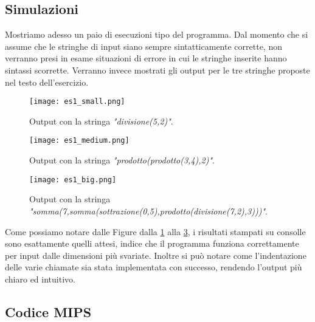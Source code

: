 	\subsection*{Simulazioni}
		Mostriamo adesso un paio di esecuzioni tipo del programma. Dal momento che si assume che le stringhe di input siano sempre sintatticamente corrette, non verranno presi in esame situazioni di errore in cui le stringhe inserite hanno sintassi scorrette. Verranno invece mostrati gli output per le tre stringhe proposte nel testo dell'esercizio.
		
       	\begin{figure}[h!]
       		\begin{center}
       			\texttt{[image: es1\_small.png]}
       		\end{center}
       		\caption{Output con la stringa \textit{"divisione(5,2)"}.}
       		\label{fig:es1_small}
       	\end{figure}
       	
       	\begin{figure}[h!]
       		\begin{center}
       			\texttt{[image: es1\_medium.png]}
       		\end{center}
       		\caption{Output con la stringa \textit{"prodotto(prodotto(3,4),2)"}.}
       		\label{fig:es1_medium}
       	\end{figure}
       	
       	\begin{figure}[h!]
       		\begin{center}
       			\texttt{[image: es1\_big.png]}
       		\end{center}
       		\caption{Output con la stringa \textit{"somma(7,somma(sottrazione(0,5),prodotto(divisione(7,2),3)))"}.}
       		\label{fig:es1_big}
       	\end{figure}
       	
       	Come possiamo notare dalle Figure dalla \ref{fig:es1_small} alla \ref{fig:es1_big}, i risultati stampati su consolle sono esattamente quelli attesi, indice che il programma funziona correttamente per input dalle dimensioni più svariate. Inoltre si può notare come l'indentazione delle varie chiamate sia stata implementata con successo, rendendo l'output più chiaro ed intuitivo.
       	
       	\FloatBarrier
       	
    \subsection*{Codice MIPS}
		

